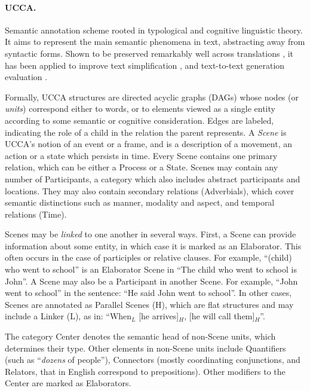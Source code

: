 \documentclass[11pt,a4paper]{article}
\begin{document}
\paragraph{UCCA.}\label{sec:ucca}
  Semantic annotation scheme rooted in typological 
  and cognitive linguistic theory.
  It aims to represent the main semantic phenomena in text, abstracting away from syntactic forms.
  Shown to be preserved remarkably well across translations \citep{sulem2015conceptual}, it has been applied to
  improve text simplification \citep{sulem2018simple},
  and text-to-text generation evaluation \citep{birch2016hume,choshen2018usim,sulem2018samsa}.

  Formally, UCCA structures are directed acyclic graphs (DAGs) whose nodes (or {\it units}) correspond either to words,
  or to elements viewed as a single entity according to some semantic or cognitive consideration.
  Edges are labeled, indicating the role of a child in the relation the parent represents.
  A {\it Scene} is UCCA's notion of an event or a frame, and is a description of a movement, an action or a state which persists in time. 
  Every Scene contains one primary relation, which can be either a Process or a State. 
  Scenes may contain any number of Participants, a category which also includes abstract participants and locations.
  They may also contain secondary relations (Adverbials), which cover semantic distinctions such as manner, modality and aspect,
  and temporal relations (Time).

  Scenes may be \textit{linked} to one another in several ways.
  First, a Scene can provide information about some entity,
  in which case it is marked as an Elaborator.
  This often occurs in the case of participles or relative clauses.
  For example, ``(child) who went to school'' is an Elaborator Scene
  in ``The child who went to school is John''.
  A Scene may also be a Participant in another Scene. For example, ``John went to school'' in the sentence: ``He said John went to school''. 
  In other cases, Scenes are annotated as Parallel Scenes (H), which are flat structures and may include a Linker (L), 
  as in:  ``When$_L$ [he arrives]$_H$, [he will call them]$_H$''.

  The category Center denotes the semantic head of non-Scene units,
  which determines their type. 
  Other elements in non-Scene units include Quantifiers (such as ``{\it dozens} of people''), Connectors (mostly
  coordinating conjunctions, and Relators, that in English correspond to prepositions).
  Other modifiers to the Center are marked as Elaborators.
  
\end{document}
